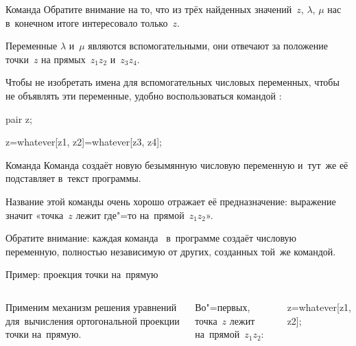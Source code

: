 
\begin{frame}{Команда }
Обратите внимание на то, что из трёх найденных значений~$z$, $\lambda$, $\mu$
нас в~конечном итоге интересовало только~$z$.

Переменные $\lambda$ и~$\mu$ являются вспомогательными, они отвечают за
положение точки~$z$ на прямых~$z_1z_2$ и~$z_3z_4$.

Чтобы не изобретать имена для вспомогательных числовых переменных, чтобы не
объявлять эти переменные, удобно воспользоваться командой :
\begin{programlisting}
pair z;\par
z=whatever[z1, z2]=whatever[z3, z4];
\end{programlisting}
\end{frame}


\begin{frame}{Команда }
Команда  создаёт новую безымянную числовую переменную
и~тут~же её подставляет в~текст программы.

Название этой команды очень хорошо отражает её предназначение: выражение
 значит «точка~$z$ лежит где"=то
на~прямой~$z_1z_2$».

Обратите внимание: каждая команда~ в~программе создаёт
числовую переменную, полностью независимую от других, созданных той~же
командой.
\end{frame}


\begin{frame}{Пример: проекция точки на~прямую}
\begin{columns}
\centering
{}%
%
Применим механизм решения уравнений для~вычисления ортогональной проекции точки
на~прямую.

\pause
\bigskip
Во"=первых, точка~$z$ лежит на~прямой~$z_1z_2$:
\begin{programlisting}
z=whatever[z1, z2];
\end{programlisting}
\end{columns}
\end{frame}


